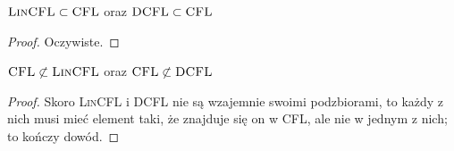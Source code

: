 \begin{theorem}
     \( \textsc{LinCFL} \subset \textsc{CFL}\) oraz \( \textsc{DCFL} \subset \textsc{CFL} \)
\end{theorem}
\begin{proof}
    Oczywiste.
\end{proof}

\begin{theorem}
     \( \textsc{CFL} \not\subset \textsc{LinCFL}\) oraz \( \textsc{CFL} \not \subset \textsc{DCFL} \)
\end{theorem}
\begin{proof}
    Skoro \textsc{LinCFL} i \textsc{DCFL} nie są wzajemnie swoimi podzbiorami, to każdy z nich musi mieć element taki, że znajduje się on w \textsc{CFL}, ale nie w jednym z nich; to kończy dowód. 
\end{proof}
